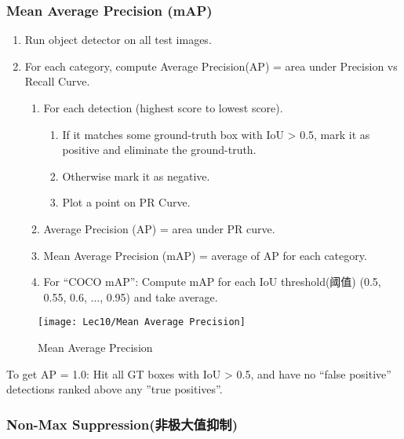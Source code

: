 \subsubsection{Mean Average Precision (mAP)}
\begin{multicols}{2}
    
    \begin{enumerate}
        \item Run object detector on all test images.
        \item For each category, compute Average Precision(AP) = area under Precision vs Recall Curve.
        \begin{enumerate}
            \item For each detection (highest score to lowest score).
            \begin{enumerate}
                \item If it matches some ground-truth box with IoU > 0.5, mark it as positive and eliminate the ground-truth.
                \item Otherwise mark it as negative.
                \item Plot a point on PR Curve. 
            \end{enumerate}
            \item Average Precision (AP) = area under PR curve.
            \item Mean Average Precision (mAP) = average of AP for each category. 
            \item For “COCO mAP”: Compute mAP for each IoU threshold(阈值) (0.5, 0.55, 0.6, ..., 0.95) and take average. 
        \end{enumerate}
    \end{enumerate}

    \columnbreak
    
    \begin{figure}[H]
        \centering
        \texttt{[image: Lec10/Mean Average Precision]}
        \caption{Mean Average Precision}
    \end{figure}

\end{multicols}
To get AP = 1.0: 
Hit all GT boxes with IoU > 0.5, and have no ``false positive'' detections ranked above any ''true positives''.

\subsubsection{Non-Max Suppression(非极大值抑制)}

